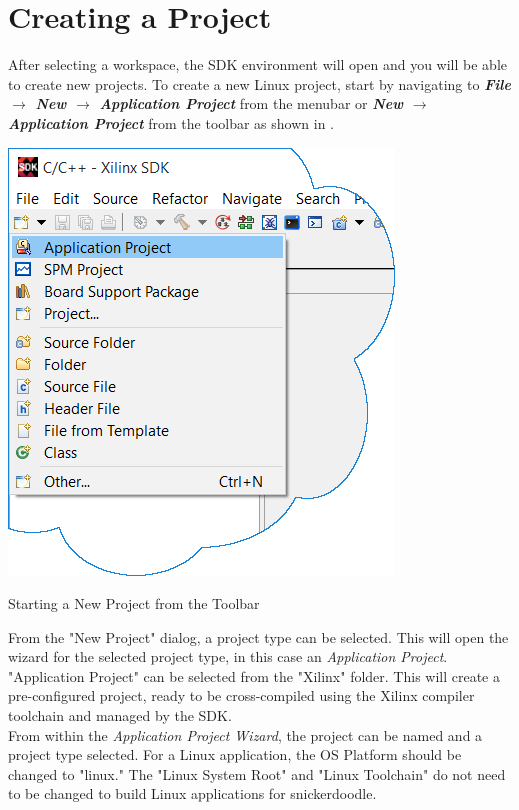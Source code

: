 \section{Creating a Project}

\noindent
After selecting a workspace, the SDK environment will open and you will be able to create new projects. To create a new Linux project, start by navigating to \textit{\bfseries File $\rightarrow$ New $\rightarrow$ Application Project} from the menubar or \textit{\bfseries New $\rightarrow$ Application Project} from the toolbar as shown in . \\

\begin{marginfigure}
	\centering
	\includegraphics{images/New_Project.png}
	\caption[Starting a New Project from the Toolbar]{Starting a New Project from the Toolbar}
	\label{fig:newproject}
\end{marginfigure}


\noindent
From the "New Project" dialog, a project type can be selected. This will open the wizard for the selected project type, in this case an \textit{Application Project}. "Application Project" can be selected from the "Xilinx" folder. This will create a pre-configured project, ready to be cross-compiled using the Xilinx compiler toolchain and managed by the SDK. \\


\noindent
From within the \textit{Application Project Wizard}, the project can be named and a project type selected. For a Linux application, the OS Platform should be changed to "linux." The "Linux System Root" and "Linux Toolchain" do not need to be changed to build Linux applications for snickerdoodle. \\

